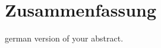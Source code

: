 \section*{Zusammenfassung}
german version of your abstract.


\cleardoublepage
\insertblankpage
\tableofcontents


\cleardoublepage
\insertblankpage
\listoffigures


\cleardoublepage
\insertblankpage

